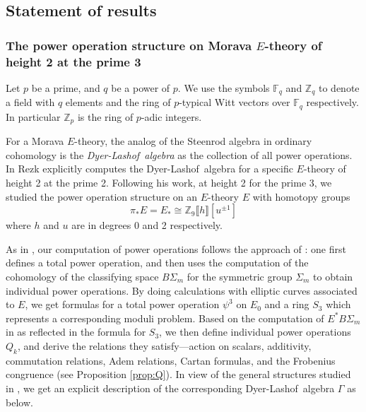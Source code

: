 \documentclass{gtpart}
\theoremstyle{definition}
\theoremstyle{remark}
\newcommand{\mb}[1]{\mathbb{#1}}
\newcommand{\DL}{Dyer-Lashof~}
\newcommand{\BF}{{\mb F}}
\newcommand{\BZ}{{\mb Z}}
\newcommand{\G}{\Gamma}
\newcommand{\p}{\psi^3}
\numberwithin{equation}{section}
\numberwithin{thm}{section}
\begin{document}
\subsection{Statement of results}
\label{subsec:res}

\subsubsection*{The power operation structure on Morava $E$-theory of height 2 at the prime 3}

Let $p$ be a prime, and $q$ be a power of $p$.  We use the symbols 
$\BF_q$ and $\BZ_q$ to denote a field with $q$ elements and the ring of 
$p$-typical Witt vectors over $\BF_q$ respectively.  In particular 
$\BZ_p$ is the ring of $p$-adic integers.  

For a Morava $E$-theory, the analog of the Steenrod algebra in ordinary 
cohomology is the {\em \DL algebra} as the collection of all power 
operations.  In \cite{h2p2} Rezk explicitly computes the \DL algebra for 
a specific $E$-theory of height 2 at the prime 2.  Following his work, 
at height 2 for the prime 3, we studied the power operation structure on 
an $E$-theory $E$ with homotopy groups 
\[
 \pi_* E = E_* \cong \BZ_9 \llbracket h \rrbracket [u^{\pm 1}] 
\]
where $h$ and $u$ are in degrees 0 and 2 respectively.  

As in \cite{h2p2}, our computation of power operations follows the 
approach of \cite{steenrod}: one first defines a total power operation, 
and then uses the computation of the cohomology of the classifying space 
$B\Sigma_m$ for the symmetric group $\Sigma_m$ to obtain individual 
power operations.  By doing calculations with elliptic curves associated 
to $E$, we get formulas for a total power operation $\p$ on $E_0$ and a 
ring $S_3$ which represents a corresponding moduli problem.  Based on 
the computation of $E^* B\Sigma_m$ in \cite{Str98} as reflected in the 
formula for $S_3$, we then define individual power operations $Q_k$, and 
derive the relations they satisfy---action on scalars, additivity, 
commutation relations, Adem relations, Cartan formulas, and the 
Frobenius congruence (see Proposition \ref{prop:Q}).  In view of the 
general structures studied in \cite{cong}, we get an explicit 
description of the corresponding \DL algebra $\G$ as below.  
\end{document}
